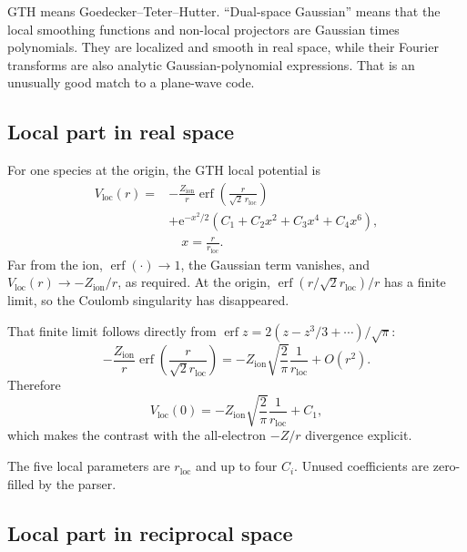 \documentclass[10pt,twocolumn]{article}
\newcommand{\e}{\mathrm{e}}
\newcommand{\vloc}{V_{\mathrm{loc}}}
\newcommand{\zion}{Z_{\mathrm{ion}}}
\DeclareMathOperator{\erf}{erf}
\begin{document}
GTH means Goedecker--Teter--Hutter.  ``Dual-space Gaussian'' means that the
local smoothing functions and non-local projectors are Gaussian times
polynomials.  They are localized and smooth in real space, while their
Fourier transforms are also analytic Gaussian-polynomial expressions.  That
is an unusually good match to a plane-wave code.

\subsection{Local part in real space}

For one species at the origin, the GTH local potential is
\begin{align}
\vloc(r)
={}&-\frac{\zion}{r}
\erf\left(\frac{r}{\sqrt{2}\,r_{\mathrm{loc}}}\right)
\nonumber\\
&+\e^{-x^2/2}
\left(C_1+C_2x^2+C_3x^4+C_4x^6\right),
\nonumber\\[-2pt]
&\hspace{1em}x=\frac{r}{r_{\mathrm{loc}}}.
\label{eq:vloc-real}
\end{align}
Far from the ion, \(\erf(\cdot)\to1\), the Gaussian term vanishes, and
\(\vloc(r)\to-\zion/r\), as required.  At the origin,
\(\erf(r/\sqrt{2}r_{\mathrm{loc}})/r\) has a finite limit, so the Coulomb
singularity has disappeared.

That finite limit follows directly from
\(\erf z=2(z-z^3/3+\cdots)/\sqrt\pi\):
\begin{equation}
-\frac{\zion}{r}
\erf\left(\frac{r}{\sqrt2r_{\mathrm{loc}}}\right)
=-\zion\sqrt{\frac2\pi}\frac1{r_{\mathrm{loc}}}+O(r^2).
\end{equation}
Therefore
\begin{equation}
V_{\mathrm{loc}}(0)=
-\zion\sqrt{\frac2\pi}\frac1{r_{\mathrm{loc}}}+C_1,
\end{equation}
which makes the contrast with the all-electron \(-Z/r\) divergence explicit.

The five local parameters are \(r_{\mathrm{loc}}\) and up to four \(C_i\).
Unused coefficients are zero-filled by the parser.

\subsection{Local part in reciprocal space}
\end{document}
